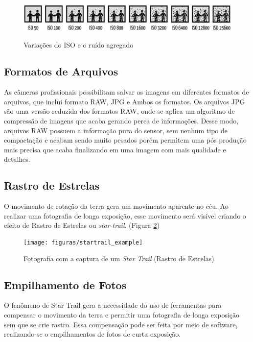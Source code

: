 \begin{figure}[h]
	\centering
	\caption{Variações do ISO e o ruído agregado}
	\includegraphics[width=0.7\linewidth]{figuras/ISO}
	\label{fig:iso}
\end{figure}

\subsection{Formatos de Arquivos}

As câmeras profissionais possibilitam salvar as imagens em diferentes formatos de arquivos, que inclui formato RAW, JPG e Ambos os formatos. Os arquivos JPG são uma versão reduzida dos formatos RAW, onde se aplica um algoritmo de compressão de imagens que acaba gerando perca de informações. Desse modo, arquivos RAW possuem a informação pura do sensor, sem nenhum tipo de compactação e acabam sendo muito pesados porém permitem uma pós produção mais precisa que acaba finalizando em uma imagem com mais qualidade e detalhes. \cite{book:bbcsky}

\subsection{Rastro de Estrelas}

O movimento de rotação da terra gera um movimento aparente no céu. Ao realizar uma fotografia de longa exposição, esse movimento será visível criando o efeito de Rastro de Estrelas ou \textit{star-trail}. (Figura \ref{fig:startrail_example})

\begin{figure}[htb]
	\centering
	\caption{Fotografia com a captura de um \textit{Star Trail} (Rastro de Estrelas)}
	\texttt{[image: figuras/startrail\_example]}
	\label{fig:startrail_example}
\end{figure}

\subsection{Empilhamento de Fotos}

O fenômeno de Star Trail gera a necessidade do uso de ferramentas para compensar o movimento da terra e permitir uma fotografia de longa exposição sem que se crie rastro. Essa compensação pode ser feita por meio de software, realizando-se o empilhamentos de fotos de curta exposição. \cite{livro:astropratica}

